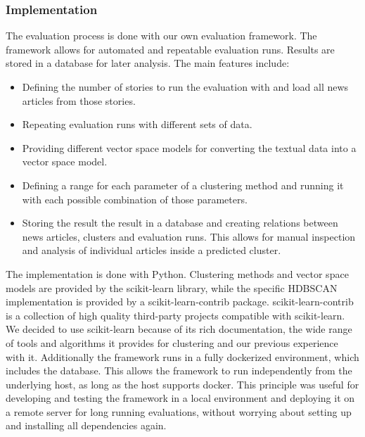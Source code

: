 \subsubsection{Implementation}
\label{subsubsec:4b_implementation}

The evaluation process is done with our own evaluation framework.
The framework allows for automated and repeatable evaluation runs.
Results are stored in a database for later analysis.
The main features include:

\begin{itemize}
    \item Defining the number of stories to run the evaluation with and load all news articles from those stories.
    \item Repeating evaluation runs with different sets of data.
    \item Providing different vector space models for converting the textual data into a vector space model.
    \item Defining a range for each parameter of a clustering method and running it with each possible combination of those parameters.
    \item Storing the result the result in a database and creating relations between news articles, clusters and evaluation runs. This allows for manual inspection and analysis of individual articles inside a predicted cluster.
\end{itemize}

The implementation is done with Python.
Clustering methods and vector space models are provided by the scikit-learn library\cite{scikit-learn},
while the specific HDBSCAN implementation is provided by a scikit-learn-contrib package\cite{McInnes2017}.
scikit-learn-contrib is a collection of high quality third-party projects compatible with scikit-learn.
We decided to use scikit-learn because of its rich documentation,
the wide range of tools and algorithms it provides for clustering and our previous experience with it.
Additionally the framework runs in a fully dockerized environment, which includes the database.
This allows the framework to run independently from the underlying host, as long as the host supports docker.
This principle was useful for developing and testing the framework in a local environment and deploying it on a remote server for long running evaluations,
without worrying about setting up and installing all dependencies again.

